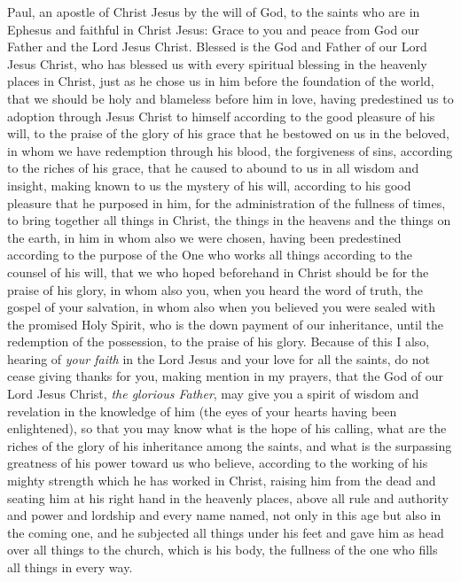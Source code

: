 
\begin{biblechapter} %
 Paul, an apostle of Christ Jesus by the will of God, to the saints who are in Ephesus and faithful in Christ Jesus:
\verse Grace to you and peace from God our Father and the Lord Jesus Christ.
 Blessed is the God and Father of our Lord Jesus Christ, who has blessed us with every spiritual blessing in the heavenly places in Christ,
\verse just as he chose us in him before the foundation of the world, that we should be holy and blameless before him in love,
\verse having predestined us to adoption through Jesus Christ to himself according to the good pleasure of his will,
\verse to the praise of the glory of his grace that he bestowed on us in the beloved,
\verse in whom we have redemption through his blood, the forgiveness of sins, according to the riches of his grace,
\verse that he caused to abound to us in all wisdom and insight,
\verse making known to us the mystery of his will, according to his good pleasure that he purposed in him,
\verse for the administration of the fullness of times, to bring together all things in Christ, the things in the heavens and the things on the earth, in him
\verse in whom also we were chosen, having been predestined according to the purpose of the One who works all things according to the counsel of his will,
\verse that we who hoped beforehand in Christ should be for the praise of his glory,
\verse in whom also you, when you heard the word of truth, the gospel of your salvation, in whom also when you believed you were sealed with the promised Holy Spirit,
\verse who is the down payment of our inheritance, until the redemption of the possession, to the praise of his glory.
 Because of this I also, hearing of \textit{your faith} in the Lord Jesus and your love for all the saints,
\verse do not cease giving thanks for you, making mention in my prayers,
\verse that the God of our Lord Jesus Christ, \textit{the glorious Father}, may give you a spirit of wisdom and revelation in the knowledge of him
\verse (the eyes of your hearts having been enlightened), so that you may know what is the hope of his calling, what are the riches of the glory of his inheritance among the saints,
\verse and what is the surpassing greatness of his power toward us who believe, according to the working of his mighty strength
\verse which he has worked in Christ, raising him from the dead and seating him at his right hand in the heavenly places,
\verse above all rule and authority and power and lordship and every name named, not only in this age but also in the coming one,
\verse and he subjected all things under his feet and gave him as head over all things to the church,
\verse which is his body, the fullness of the one who fills all things in every way.
\end{biblechapter}

